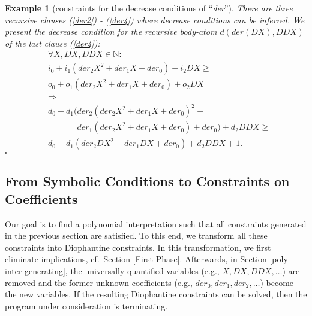 \documentclass[envcountsame]{tlp}
\newcounter{ex:der-lastsymconsctr}
\newtheorem{example}{Example}
\begin{document}
\begin{example}[constraints for
the decrease conditions of  ``\textit{der}''] 
\label{der:symboldecreasecond}
	There are three recursive clauses  
(\ref{der2}) - (\ref{der4}) 
where decrease conditions can be
inferred. We present the decrease condition for the 
	recursive body-atom $d(\mathit{der}(\mathit{DX}),\mathit{DDX})$ of the
last clause (\ref{der4}):  
        	\begin{align}
        		&   \forall X, \mathit{DX}, \mathit{DDX} \in
						\mathbb{N}:
\nonumber       \\ 
        		&
i_0+i_1(\mathit{der}_2X^2+\mathit{der}_1X+\mathit{der}_0)+i_2\mathit{DX} \ge
\nonumber       \\ 
        		&
o_0+o_1(\mathit{der}_2X^2+\mathit{der}_1X+\mathit{der}_0)+ o_2\mathit{DX}
\nonumber       \\ 
        		&   \Rightarrow               \label{der:decreasecons}\\
        		&   d_0 +
			d_1(\mathit{der}_2(\mathit{der}_2X^2+\mathit{der}_1X+\mathit{der}_0)^2+ 
\nonumber \\  
			& \phantom{d_0 +
			d_1(}
			\mathit{der}_1(\mathit{der}_2X^2+\mathit{der}_1X
+\mathit{der}_0)+\mathit{der}_0)
			+d_2 \mathit{DDX}  \ge \nonumber\\
        		&   d_0 +
			d_1(\mathit{der}_2\mathit{DX}^2+\mathit{der}_1\mathit{DX}
+\mathit{der}_0)+
			d_2 \mathit{DDX} +1. \nonumber
        	\end{align}
{\hfill{$\square$}}
\end{example}


\subsection{From Symbolic Conditions to Constraints on Coefficients}
\label{rewriting}

Our goal is to find a polynomial interpretation such that all
constraints generated in the previous section are satisfied. To this
end, we transform all these constraints into Diophantine
constraints. In this transformation, we first eliminate
implications, cf.\ Section \ref{First Phase}. Afterwards, in Section \ref{poly-inter-generating},  
the universally quantified variables
(e.g., $X, DX, DDX, \ldots$) are removed
and the former unknown
coefficients (e.g., $\mathit{der}_0, \mathit{der}_1, \mathit{der}_2,  \ldots$)
become the new variables. If the resulting
Diophantine constraints can be solved, then the program under consideration is
terminating.
\end{document}
